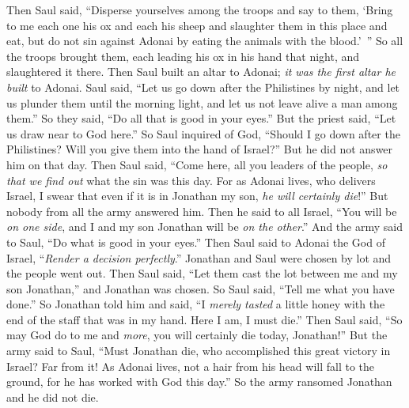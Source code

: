\begin{biblechapter}
\verse Then Saul said, “Disperse yourselves among the troops and say to them, ‘Bring to me each one his ox and each his sheep and slaughter them in this place and eat, but do not sin against Adonai by eating the animals with the blood.’ ” So all the troops brought them, each leading his ox in his hand that night, and slaughtered it there.
 Then Saul built an altar to Adonai; \textit{it was the first altar he built} to Adonai.
\verse Saul said, “Let us go down after the Philistines by night, and let us plunder them until the morning light, and let us not leave alive a man among them.” So they said, “Do all that is good in your eyes.” But the priest said, “Let us draw near to God here.”
\verse So Saul inquired of God, “Should I go down after the Philistines? Will you give them into the hand of Israel?” But he did not answer him on that day.
\verse Then Saul said, “Come here, all you leaders of the people, \textit{so that we find out} what the sin was this day.
\verse For as Adonai lives, who delivers Israel, I swear that even if it is in Jonathan my son, \textit{he will certainly die}!” But nobody from all the army answered him.
\verse Then he said to all Israel, “You will be \textit{on one side}, and I and my son Jonathan will be \textit{on the other}.” And the army said to Saul, “Do what is good in your eyes.”
\verse Then Saul said to Adonai the God of Israel, “\textit{Render a decision perfectly}.” Jonathan and Saul were chosen by lot and the people went out.
\verse Then Saul said, “Let them cast the lot between me and my son Jonathan,” and Jonathan was chosen.
\verse So Saul said, “Tell me what you have done.” So Jonathan told him and said, “I \textit{merely tasted} a little honey with the end of the staff that was in my hand. Here I am, I must die.”
\verse Then Saul said, “So may God do to me and \textit{more}, you will certainly die today, Jonathan!”
\verse But the army said to Saul, “Must Jonathan die, who accomplished this great victory in Israel? Far from it! As Adonai lives, not a hair from his head will fall to the ground, for he has worked with God this day.” So the army ransomed Jonathan and he did not die.

\end{biblechapter}
